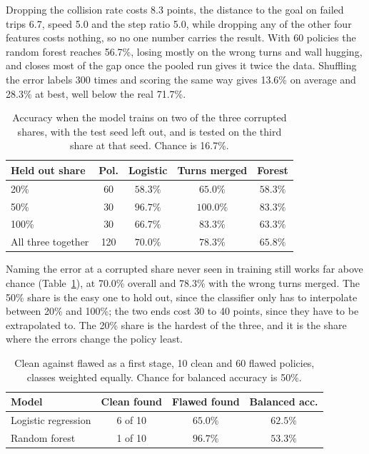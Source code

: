 \documentclass[conference]{IEEEtran}
\begin{document}
Dropping the collision rate costs 8.3 points, the distance to the goal on failed trips 6.7, speed 5.0 and the
step ratio 5.0, while dropping any of the other four features costs nothing, so no one number carries the result.
With 60 policies the random forest reaches 56.7\%, losing mostly on the wrong turns and wall hugging, and closes
most of the gap once the pooled run gives it twice the data. Shuffling the error labels 300 times and scoring the
same way gives 13.6\% on average and 28.3\% at best, well below the real 71.7\%.

\begin{table}[tbp]
\centering\footnotesize
\begin{tabular}{@{}lcccc@{}}
\toprule
Held out share & Pol. & Logistic & Turns merged & Forest\\
\midrule
20\% & 60 & $58.3\%$ & $65.0\%$ & $58.3\%$\\
50\% & 30 & $96.7\%$ & $100.0\%$ & $83.3\%$\\
100\% & 30 & $66.7\%$ & $83.3\%$ & $63.3\%$\\
All three together & 120 & $\mathbf{70.0\%}$ & $78.3\%$ & $65.8\%$\\
\bottomrule
\end{tabular}
\caption{Accuracy when the model trains on two of the three corrupted shares, with the test seed left out, and is
tested on the third share at that seed. Chance is 16.7\%.}
\label{tab:dose-classify}
\end{table}

Naming the error at a corrupted share never seen in training still works far above chance
(Table~\ref{tab:dose-classify}), at 70.0\% overall and 78.3\% with the wrong turns merged. The 50\% share is the
easy one to hold out, since the classifier only has to interpolate between 20\% and 100\%; the two ends cost 30
to 40 points, since they have to be extrapolated to. The 20\% share is the hardest of the three, and it is the
share where the errors change the policy least.

\begin{table}[tbp]
\centering\footnotesize
\begin{tabular}{@{}lccc@{}}
\toprule
Model & Clean found & Flawed found & Balanced acc.\\
\midrule
Logistic regression & 6 of 10 & $65.0\%$ & $62.5\%$\\
Random forest & 1 of 10 & $96.7\%$ & $53.3\%$\\
\bottomrule
\end{tabular}
\caption{Clean against flawed as a first stage, 10 clean and 60 flawed policies, classes weighted equally. Chance
for balanced accuracy is 50\%.}
\label{tab:stage1}
\end{table}
\end{document}
